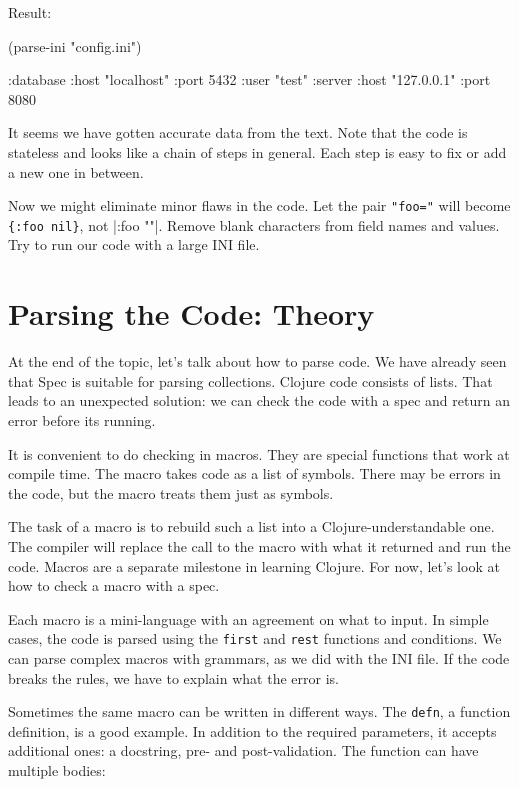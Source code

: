 \noindent
Result:

\begin{english}
  \begin{clojure}
(parse-ini "config.ini")

{:database {:host "localhost"
            :port 5432
            :user "test"}
 :server {:host "127.0.0.1"
          :port 8080}}
  \end{clojure}
\end{english}

It seems we have gotten accurate data from the text. Note that the code is stateless and looks like a chain of steps in general. Each step is easy to fix or add a new one in between.

Now we might eliminate minor flaws in the code. Let the pair \verb|"foo="| will become \verb|{:foo nil}|, not \spverb|{:foo ""}|. Remove blank characters from field names and values. Try to run our code with a large INI file.

\section{Parsing the Code: Theory}


At the end of the topic, let's talk about how to parse code. We have already seen that Spec is suitable for parsing collections. Clojure code consists of lists. That leads to an unexpected solution: we can check the code with a spec and return an error before its running.

It is convenient to do checking in macros. They are special functions that work at compile time. The macro takes code as a list of symbols. There may be errors in the code, but the macro treats them just as symbols.

The task of a macro is to rebuild such a list into a Clojure-understandable one. The compiler will replace the call to the macro with what it returned and run the code. Macros are a separate milestone in learning Clojure. For now, let's look at how to check a macro with a spec.

Each macro is a mini-language with an agreement on what to input. In simple cases, the code is parsed using the \verb|first| and \verb|rest| functions and conditions. We can parse complex macros with grammars, as we did with the INI file. If the code breaks the rules, we have to explain what the error is.

Sometimes the same macro can be written in different ways. The \verb|defn|, a function definition, is a good example. In addition to the required parameters, it accepts additional ones: a docstring, pre- and post-validation. The function can have multiple bodies:

